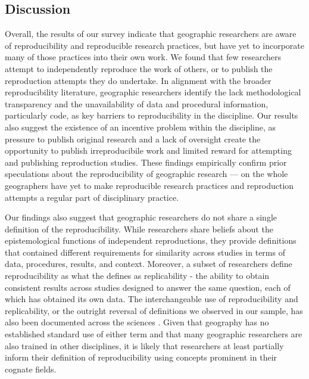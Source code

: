 \documentclass[]{interact}
\theoremstyle{plain}%
\theoremstyle{definition}
\theoremstyle{remark}
\begin{document}
\subsection*{Discussion}
Overall, the results of our survey indicate that geographic researchers are aware of reproducibility and reproducible research practices, but have yet to incorporate many of those practices into their own work. 
We found that few researchers attempt to independently reproduce the work of others, or to publish the reproduction attempts they do undertake.
In alignment with the broader reproducibility literature, geographic researchers identify the lack methodological transparency and the unavailability of data and procedural information, particularly code, as key barriers to reproducibility in the discipline. 
Our results also suggest the existence of an incentive problem within the discipline, as pressure to publish original research and a lack of oversight create the opportunity to publish irreproducibile work and limited reward for attempting and publishing reproduction studies.  
These findings empirically confirm prior speculations about the reproducibility of geographic research --- on the whole geographers have yet to make reproducible research practices and reproduction attempts a regular part of disciplinary practice. 

Our findings also suggest that geographic researchers do not share a single definition of the reproducibility. 
While researchers share beliefs about the epistemological functions of independent reproductions, they provide definitions that contained different requirements for similarity across studies in terms of data, procedures, results, and context.  
Moreover, a subset of researchers define reproducibility as what the \citet{NASEM2019} defines as replicability - the ability to obtain consistent results across studies designed to answer the same question, each of which has obtained its own data.
The interchangeable use of reproducibility and replicability, or the outright reversal of definitions we observed in our sample, has also been documented across the sciences \citep{barba2018terminologies, plesser2018reproducibility}. 
Given that geography has no established standard use of either term and that many geographic researchers are also trained in other disciplines, it is likely that researchers at least partially inform their definition of reproducibility using concepts prominent in their cognate fields.
\end{document}
